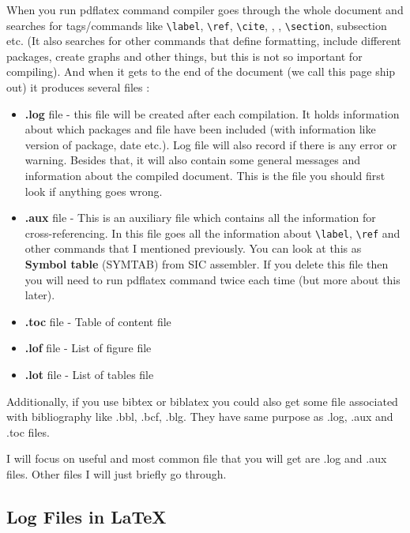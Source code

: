 \documentclass[a4paper,oneside,8pt]{extarticle}
\newcommand{\latex}{\LaTeX\xspace}
\begin{document}
When you run pdflatex command compiler goes through the whole document and searches for tags/commands like \verb|\label|, \verb|\ref|, \verb|\cite|, \verb||, \verb||, \verb|\section|, subsection etc. (It also searches for other commands that define formatting, include different packages, create graphs and other things, but this is not so important for compiling). And when it gets to the end of the document (we call this page ship out) it produces several files \cite{Dickimaw_Books}:
\begin{itemize}
	\item \textbf{.log} file - this file will be created after each compilation. It holds information about which packages and file have been included (with information like version of package, date etc.). Log file will also record if there is any error or warning. Besides that, it will also contain some general messages and information about the compiled document. This is the file you should first look if anything goes wrong.
	\item \textbf{.aux} file - This is an auxiliary file which contains all the information for cross-referencing. In this file goes all the information about \verb|\label|, \verb|\ref| and other commands that I mentioned previously. You can look at this as \textbf{Symbol table} (SYMTAB) from SIC assembler. If you delete this file then you will need to run pdflatex command twice each time (but more about this later).
	\item \textbf{.toc} file - Table of content file
	\item \textbf{.lof} file - List of figure file
	\item \textbf{.lot} file - List of tables  file
\end{itemize}

Additionally, if you use bibtex or biblatex you could also get some file associated with bibliography like .bbl, .bcf, .blg. They have same purpose as .log, .aux and .toc files.

I will focus on useful and most common file that you will get are .log and .aux files. Other files I will just briefly go through. 

\subsection{Log Files in \latex}
\end{document}
